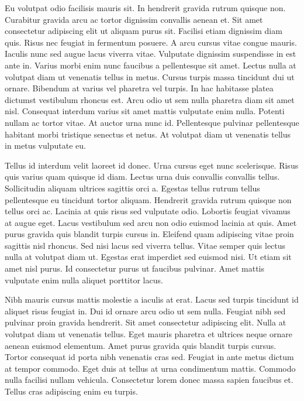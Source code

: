 \documentclass[11pt,a4paper]{article}
\begin{document}
Eu volutpat odio facilisis mauris sit. In hendrerit gravida rutrum quisque non. Curabitur gravida arcu ac tortor dignissim convallis aenean et. Sit amet consectetur adipiscing elit ut aliquam purus sit. Facilisi etiam dignissim diam quis. Risus nec feugiat in fermentum posuere. A arcu cursus vitae congue mauris. Iaculis nunc sed augue lacus viverra vitae. Vulputate dignissim suspendisse in est ante in. Varius morbi enim nunc faucibus a pellentesque sit amet. Lectus nulla at volutpat diam ut venenatis tellus in metus. Cursus turpis massa tincidunt dui ut ornare. Bibendum at varius vel pharetra vel turpis. In hac habitasse platea dictumst vestibulum rhoncus est. Arcu odio ut sem nulla pharetra diam sit amet nisl. Consequat interdum varius sit amet mattis vulputate enim nulla. Potenti nullam ac tortor vitae. At auctor urna nunc id. Pellentesque pulvinar pellentesque habitant morbi tristique senectus et netus. At volutpat diam ut venenatis tellus in metus vulputate eu.

Tellus id interdum velit laoreet id donec. Urna cursus eget nunc scelerisque. Risus quis varius quam quisque id diam. Lectus urna duis convallis convallis tellus. Sollicitudin aliquam ultrices sagittis orci a. Egestas tellus rutrum tellus pellentesque eu tincidunt tortor aliquam. Hendrerit gravida rutrum quisque non tellus orci ac. Lacinia at quis risus sed vulputate odio. Lobortis feugiat vivamus at augue eget. Lacus vestibulum sed arcu non odio euismod lacinia at quis. Amet purus gravida quis blandit turpis cursus in. Eleifend quam adipiscing vitae proin sagittis nisl rhoncus. Sed nisi lacus sed viverra tellus. Vitae semper quis lectus nulla at volutpat diam ut. Egestas erat imperdiet sed euismod nisi. Ut etiam sit amet nisl purus. Id consectetur purus ut faucibus pulvinar. Amet mattis vulputate enim nulla aliquet porttitor lacus.

Nibh mauris cursus mattis molestie a iaculis at erat. Lacus sed turpis tincidunt id aliquet risus feugiat in. Dui id ornare arcu odio ut sem nulla. Feugiat nibh sed pulvinar proin gravida hendrerit. Sit amet consectetur adipiscing elit. Nulla at volutpat diam ut venenatis tellus. Eget mauris pharetra et ultrices neque ornare aenean euismod elementum. Amet purus gravida quis blandit turpis cursus. Tortor consequat id porta nibh venenatis cras sed. Feugiat in ante metus dictum at tempor commodo. Eget duis at tellus at urna condimentum mattis. Commodo nulla facilisi nullam vehicula. Consectetur lorem donec massa sapien faucibus et. Tellus cras adipiscing enim eu turpis.
\end{document}
